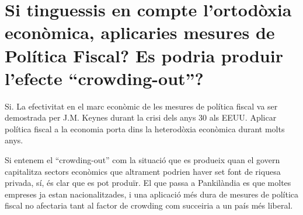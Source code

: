 \section{Si tinguessis en compte l’ortodòxia econòmica, aplicaries mesures de
Política Fiscal? Es podria produir l’efecte ``crowding-out''? }

Si. La efectivitat en el marc econòmic de les mesures de política fiscal
va ser demostrada per J.M. Keynes durant la crisi dels anys 30 als EEUU.
Aplicar política fiscal a la economia porta dins la heterodòxia econòmica
durant molts anys.

Si entenem el ``crowding-out'' \cite{crowding_out}
com la situació que es produeix quan el govern capitalitza sectors econòmics
que altrament podrien haver set font de riquesa privada, sí, és clar que es
pot produïr. El que passa a Pankilàndia es que moltes empreses ja estan
nacionalitzades, i una aplicació més dura de mesures de política fiscal
no afectaria tant al factor de crowding com succeiria a un país més
liberal.
